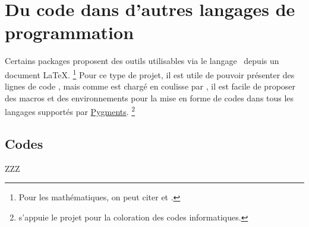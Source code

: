 \documentclass{tutodoc}
\begin{document}
\section{Du code dans d'autres langages de programmation}

Certains packages proposent des outils utilisables via le langage \lua\ depuis un document \LaTeX.%
\footnote{
	Pour les mathématiques, on peut citer  et .
}
Pour ce type de projet, il est utile de pouvoir présenter des lignes de code \lua, mais comme  est chargé en coulisse par \thisproj, il est facile de proposer des macros et des environnements pour la mise en forme de codes dans tous les langages supportés par \href{https://pygments.org/}{Pygments}.%
\footnote{
	 s'appuie le projet   pour la coloration des codes informatiques.
}



\subsection{Codes }

ZZZ
\end{document}
